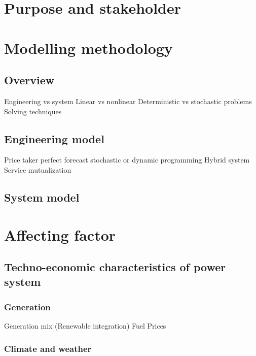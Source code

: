 \section{Purpose and stakeholder}


\section{Modelling methodology}
\subsection{Overview}
Engineering vs system
Linear vs nonlinear
Deterministic vs stochastic problems
Solving techniques

\subsection{Engineering model}
Price taker
perfect forecast
stochastic or dynamic programming
Hybrid system
Service mutualization

\subsection{System model}


\section{Affecting factor}
\subsection{Techno-economic characteristics of power system}
\subsubsection{Generation}
Generation mix (Renewable integration)
Fuel Prices
\subsubsection{Climate and weather}

